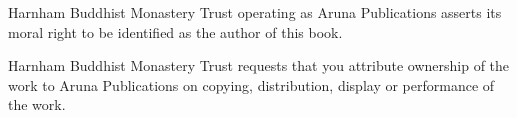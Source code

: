 {Harnham Buddhist Monastery Trust operating as Aruna Publications asserts its moral right to be identified as the author of this book.

Harnham Buddhist Monastery Trust requests that you attribute ownership of the work to Aruna Publications on copying, distribution, display or performance of the work.

}
